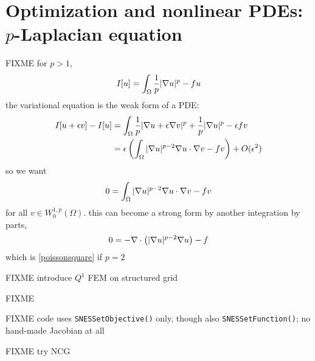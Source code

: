 \section{Optimization and nonlinear PDEs: $p$-Laplacian equation}

FIXME for $p>1$,
    $$I[u] = \int_\Omega \frac{1}{p} |\nabla u|^p - fu$$
the variational equation is the weak form of a PDE:
\begin{align*}
I[u+\epsilon v] - I[u] &= \int_\Omega \frac{1}{p} |\nabla u + \epsilon \nabla v|^p + \frac{1}{p} |\nabla u|^p - \epsilon f v \\
   &= \epsilon \left(\int_\Omega |\nabla u|^{p-2} \nabla u \cdot \nabla v - f v\right) + O(\epsilon^2)
\end{align*}
so we want
    $$0 = \int_\Omega |\nabla u|^{p-2} \nabla u \cdot \nabla v - f v$$
for all $v \in W^{1,p}_0(\Omega)$.  this can become a strong form by another integration by parts,
    $$0 = - \nabla\cdot\left(|\nabla u|^{p-2} \nabla u\right) - f$$
which is \eqref{poissonsquare} if $p=2$

FIXME introduce $Q^1$ FEM on structured grid

\begin{marginfigure}

\caption{FIXME}
\label{fig:q1hat}
\end{marginfigure}

FIXME code uses \texttt{SNESSetObjective()} only, though also \texttt{SNESSetFunction()}; no hand-made Jacobian at all

FIXME try NCG
